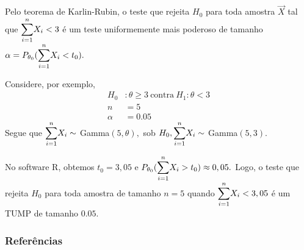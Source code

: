\documentclass[12pt]{beamer}
\begin{document}
\begin{frame}{}
\begin{block}{}
\justifying
Pelo teorema de Karlin-Rubin, o teste que rejeita $H_{0}$ para toda amostra $\Vec{X}$ tal que ${\displaystyle \sum_{i=1}^{n}} X_{i}<3$ é um teste uniformemente mais poderoso de tamanho $\alpha=P_{\theta_{0}}({\displaystyle \sum_{i=1}^{n}} X_{i}<t_{0}).$
\end{block}
\pause
\begin{block}{}
\justifying
Considere, por exemplo, 
\begin{align*}
    H_{0}&:\theta\geq 3~\text{contra}~H_{1}:\theta< 3\\
    n&=5\\
    \alpha&=0.05
\end{align*}
Segue que ${\displaystyle \sum_{i=1}^{n}} X_{i}\sim~$Gamma$(5,\theta),$ sob $H_{0}, {\displaystyle \sum_{i=1}^{n}} X_{i}\sim~$Gamma$(5,3).$
\end{block}
\end{frame}

\begin{frame}{}
\begin{block}{}
    No software R, obtemos $t_{0}=3,05$ e $P_{\theta_{0}}({\displaystyle \sum_{i=1}^{n}} X_{i}>t_{0})\approx 0,05.$ Logo, o teste que rejeita $H_{0}$ para toda amostra de tamanho $n=5$ quando ${\displaystyle \sum_{i=1}^{n}} X_{i}<3,05$ é um TUMP de tamanho $0.05.$ 
\end{block}
\nocite{hogg, casella2021statistical}
\end{frame}


%

\begin{frame}[allowframebreaks]
\frametitle{\bf Referências}
\printbibliography
\end{frame}
\end{document}
